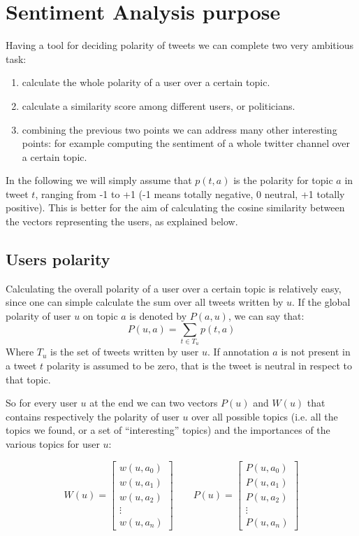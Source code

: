 \documentclass[a4paper,11pt,oneside]{article}
\begin{document}
\section{Sentiment Analysis purpose}
\label{sec:exitpoll}
Having a tool for deciding polarity of tweets we can complete two very ambitious task: 
\begin{enumerate}
\item calculate the whole polarity of a user over a certain topic.
\item calculate a similarity score among different users, or politicians.
\item combining the previous two points we can address many other interesting points: for example computing the sentiment of a whole twitter channel over a certain topic.
\end{enumerate}
In the following we will simply assume that $p(t,a)$ is the polarity for topic $a$ in tweet $t$, ranging from -1 to +1 (-1 means totally negative, 0 neutral, +1 totally positive). This is better for the aim of calculating the cosine similarity between the vectors representing the users, as explained below.

\subsection{Users polarity}
Calculating the overall polarity of a user over a certain topic is relatively easy, since one can simple calculate the sum over all tweets written by $u$. If the global polarity of user $u$ on topic $a$ is denoted by $P(a,u)$, we can say that: %
\begin{equation}
P(u,a) = \sum_{t \in T_u} p(t,a) %
\end{equation}
Where $T_u$ is the set of tweets written by user $u$. If annotation $a$ is not present in a tweet $t$ polarity is assumed to be zero, that is the tweet is neutral in respect to that topic.

So for every user $u$ at the end we can two vectors $P(u)$ and $W(u)$ that contains respectively the polarity of user $u$ over all possible topics (i.e. all the topics we found, or a set of ``interesting'' topics) and the importances of the various topics for user $u$:

\begin{equation}
W(u) = \left[  \begin{array}{c}
w(u,a_0) \\ 
w(u,a_1) \\ 
w(u,a_2) \\ 
\vdots \\ 
w(u,a_n)
\end{array}\right]\qquad
P(u) = \left[  \begin{array}{c}
P(u,a_0) \\ 
P(u,a_1) \\ 
P(u,a_2) \\ 
\vdots \\ 
P(u,a_n)
\end{array}\right]
\end{equation}
\end{document}
